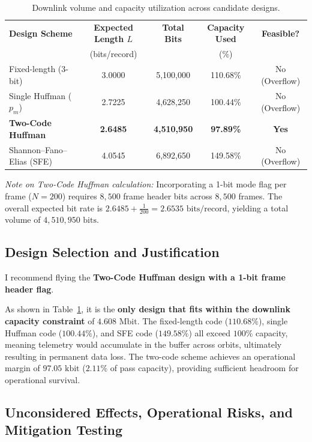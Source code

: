 \documentclass[11pt,a4paper]{article}
\begin{document}
\begin{table}[H]
    \centering
    \caption{Downlink volume and capacity utilization across candidate designs.}
    \label{tab:final_comparison}
    \begin{tabular}{lcccc}
        \toprule
        \textbf{Design Scheme} & \textbf{Expected Length $L$} & \textbf{Total Bits} & \textbf{Capacity Used} & \textbf{Feasible?} \\
        & (bits/record) & & (\%) & \\
        \midrule
        Fixed-length (3-bit) & 3.0000 & 5,100,000 & 110.68\% & No (Overflow) \\
        Single Huffman ($p_m$) & 2.7225 & 4,628,250 & 100.44\% & No (Overflow) \\
        \textbf{Two-Code Huffman} & \textbf{2.6485} & \textbf{4,510,950} & \textbf{97.89\%} & \textbf{Yes} \\
        Shannon--Fano--Elias (SFE) & 4.0545 & 6,892,650 & 149.58\% & No (Overflow) \\
        \bottomrule
    \end{tabular}
\end{table}

\textit{Note on Two-Code Huffman calculation:} Incorporating a 1-bit mode flag per frame ($N = 200$) requires $8,500$ frame header bits across $8,500$ frames. The overall expected bit rate is $2.6485 + \frac{1}{200} = 2.6535\text{ bits/record}$, yielding a total volume of $4,510,950\text{ bits}$.

\subsection{Design Selection and Justification}

I recommend flying the \textbf{Two-Code Huffman design with a 1-bit frame header flag}.

As shown in Table~\ref{tab:final_comparison}, it is the \textbf{only design that fits within the downlink capacity constraint} of $4.608\text{ Mbit}$. The fixed-length code ($110.68\%$), single Huffman code ($100.44\%$), and SFE code ($149.58\%$) all exceed $100\%$ capacity, meaning telemetry would accumulate in the buffer across orbits, ultimately resulting in permanent data loss. The two-code scheme achieves an operational margin of $97.05\text{ kbit}$ ($2.11\%$ of pass capacity), providing sufficient headroom for operational survival.

\subsection{Unconsidered Effects, Operational Risks, and Mitigation Testing}
\end{document}
